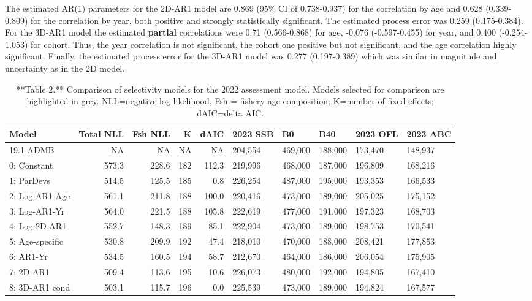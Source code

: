 \documentclass[
]{article}
\begin{document}
The estimated AR(1) parameters for the 2D-AR1 model are 0.869 (95\% CI
of 0.738-0.937) for the correlation by age and 0.628 (0.339-0.809) for
the correlation by year, both positive and strongly statistically
significant. The estimated process error was 0.259 (0.175-0.384). For
the 3D-AR1 model the estimated \textbf{partial} correlations were 0.71
(0.566-0.868) for age, -0.076 (-0.597-0.455) for year, and 0.400
(-0.254-1.053) for cohort. Thus, the year correlation is not
significant, the cohort one positive but not significant, and the age
correlation highly significant. Finally, the estimated process error for
the 3D-AR1 model was 0.277 (0.197-0.389) which was similar in magnitude
and uncertainty as in the 2D model.

\begin{table}

\caption{\label{tab:unnamed-chunk-2}**Table 2.** Comparison of selectivity models for the 2022 assessment model. Models selected for comparison are highlighted in grey. NLL=negative log likelihood, Fsh = fishery age composition; K=number of fixed effects; dAIC=delta AIC.}
\centering
\begin{tabular}[t]{l|r|r|r|r|l|l|l|l|l}
\hline
Model & Total NLL & Fsh NLL & K & dAIC & 2023 SSB & B0 & B40 & 2023 OFL & 2023 ABC\\
\hline
19.1 ADMB & NA & NA & NA & NA & 204,554 & 469,000 & 188,000 & 173,470 & 148,937\\
\hline
0: Constant & 573.3 & 228.6 & 182 & 112.3 & 219,996 & 468,000 & 187,000 & 196,809 & 168,216\\
\hline
1: ParDevs & 514.5 & 125.5 & 185 & 0.8 & 226,254 & 487,000 & 195,000 & 193,353 & 166,533\\
\hline
2: Log-AR1-Age & 561.1 & 211.8 & 188 & 100.0 & 220,416 & 473,000 & 189,000 & 205,025 & 175,152\\
\hline
3: Log-AR1-Yr & 564.0 & 221.5 & 188 & 105.8 & 222,619 & 477,000 & 191,000 & 197,323 & 168,703\\
\hline
4: Log-2D-AR1 & 552.7 & 148.3 & 189 & 85.1 & 222,904 & 473,000 & 189,000 & 198,753 & 170,541\\
\hline
5: Age-specific & 530.8 & 209.9 & 192 & 47.4 & 218,010 & 470,000 & 188,000 & 208,421 & 177,853\\
\hline
6: AR1-Yr & 534.5 & 160.5 & 194 & 58.7 & 212,670 & 464,000 & 186,000 & 206,054 & 175,905\\
\hline
7: 2D-AR1 & 509.4 & 113.6 & 195 & 10.6 & 226,073 & 480,000 & 192,000 & 194,805 & 167,410\\
\hline
8: 3D-AR1 cond & 503.1 & 115.7 & 196 & 0.0 & 225,539 & 473,000 & 189,000 & 194,824 & 167,577\\
\hline
\end{tabular}
\end{table}
\end{document}

